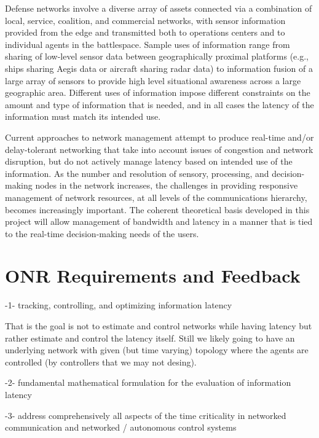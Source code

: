 \documentclass[12pt,letterpaper]{article}
\begin{document}
Defense networks involve a diverse array of assets connected via a combination of local, service, coalition, and commercial networks, with sensor information provided from the edge and transmitted both to operations centers and to individual agents in the battlespace. Sample uses of information range from sharing of low-level sensor data between geographically proximal platforms (e.g., ships sharing Aegis data or aircraft sharing radar data) to information fusion of a large array of sensors to provide high level situational awareness across a large geographic area. Different uses of information impose different constraints on the amount and type of information that is needed, and in all cases the latency of the information must match its intended use.

Current approaches to network management attempt to produce real-time and/or delay-tolerant networking that take into account issues of congestion and network disruption, but do not actively manage latency based on intended use of the information. As the number and resolution of sensory, processing, and decision-making nodes in the network increases, the challenges in providing responsive management of network resources, at all levels of the communications hierarchy, becomes increasingly important. The coherent theoretical basis developed in this project will allow management of bandwidth and latency in a manner that is tied to the real-time decision-making needs of the users.



\newpage
\section{ONR Requirements and Feedback}

-1- tracking, controlling, and optimizing information latency

That is the goal is not to estimate and control networks while having latency but rather estimate and control the latency itself. Still we likely going to have an underlying network with given (but time varying) topology where the agents are controlled (by controllers that we may not desing).
\\ \quad

-2- fundamental mathematical formulation for the evaluation of information latency
\\ \quad

-3- address comprehensively all aspects of the time criticality in networked communication and networked / autonomous control systems
\\ \quad
\end{document}
